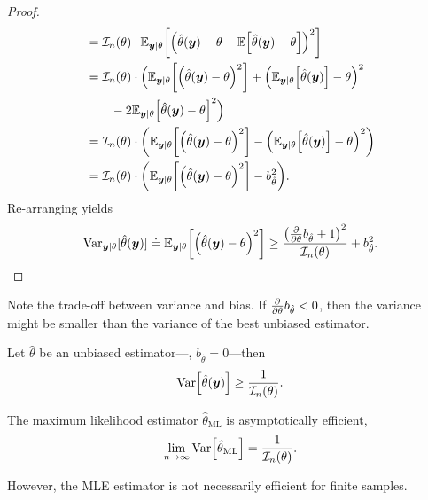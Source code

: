 \begin{proof}
\begin{align*}
                                                          & = \mathcal{I}_n(\theta) \cdot \E_{\vec{y} \mid \theta} \lft[ \lft( \hat{\theta}(\vec{y}) - \theta - \E \lft[ \hat{\theta}(\vec{y}) - \theta \rgt] \rgt)^2 \rgt]                                                                \\
                                                          & = \mathcal{I}_n(\theta) \cdot \Big( \E_{\vec{y} \mid \theta}\lft[ \lft( \hat{\theta}(\vec{y}) - \theta \rgt)^2 \rgt] + \lft( \E_{\vec{y} \mid \theta}\lft[ \hat{\theta}(\vec{y}) \rgt] - \theta \rgt)^2                        \\
                                                          & \quad \quad - 2 \E_{\vec{y}\mid \theta} \lft[ \hat{\theta}(\vec{y}) - \theta \rgt]^2 \Big)                                                                                                                                     \\
                                                          & = \mathcal{I}_n(\theta) \cdot \lft( \E_{\vec{y} \mid \theta}\lft[ \lft( \hat{\theta}(\vec{y}) - \theta \rgt)^2 \rgt] - \lft( \E_{\vec{y} \mid \theta}\lft[ \hat{\theta}(\vec{y}) \rgt] - \theta \rgt)^2 \rgt)                  \\
                                                          & = \mathcal{I}_n(\theta) \cdot \lft( \E_{\vec{y} \mid \theta} \lft[ \lft( \hat{\theta}(\vec{y}) - \theta \rgt)^2 \rgt] - b_{\hat{\theta}}^2 \rgt).
    \end{align*}
    Re-arranging yields \[
        \Var_{\vec{y} \mid \theta}[\hat{\theta}(\vec{y})] \doteq \E_{\vec{y} \mid \theta} \lft[ \lft( \hat{\theta}(\vec{y}) - \theta \rgt)^2 \rgt] \geq \frac{\lft( \pdv*{b_{\hat{\theta}}}{\theta} + 1 \rgt)^2}{\mathcal{I}_n(\theta)} + b_{\hat{\theta}}^2.
    \]
\end{proof}

Note the trade-off between variance and bias. If $\pdv*{b_{\hat{\theta}}}{\theta} < 0$, then the
variance might be smaller than the variance of the best unbiased estimator.

\begin{corollary}
    Let $\hat{\theta}$ be an unbiased estimator---\ie, $b_{\hat{\theta}} = 0$---then \[
        \Var \lft[ \hat{\theta}(\vec{y}) \rgt] \geq \frac{1}{\mathcal{I}_n(\theta)}.
    \]
\end{corollary}

\begin{lemma}
    The maximum likelihood estimator $\hat{\theta}_{\mathrm{ML}}$ is asymptotically efficient, \[
        \lim_{n\to \infty} \Var \lft[ \hat{\theta}_{\mathrm{ML}} \rgt] = \frac{1}{\mathcal{I}_n(\theta)}.
    \]
\end{lemma}

However, the MLE estimator is not necessarily efficient for finite samples.
